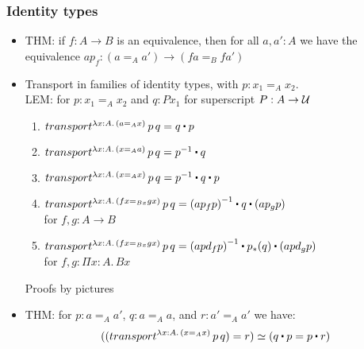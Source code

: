\documentclass[handout]{beamer}
\newcommand{\depi}[3]{\Pi{#1{:}#2.\,#3}}
\newcommand{\lamt}[3]{\lambda{#1{:}#2.\,#3}}
\newcommand{\UU}{{\cal U}}
\newcommand{\ct}{%
  \mathchoice{\mathbin{\raisebox{0.5ex}{$\displaystyle\centerdot$}}}%
             {\mathbin{\raisebox{0.5ex}{$\centerdot$}}}%
             {\mathbin{\raisebox{0.25ex}{$\scriptstyle\,\centerdot\,$}}}%
             {\mathbin{\raisebox{0.1ex}{$\scriptscriptstyle\,\centerdot\,$}}}
}
\newcommand{\opp}[1]{\mathord{{#1}^{-1}}}
\begin{document}
 \frame
  {

    \frametitle{Identity types}

    \begin{itemize}[<+->]
    \item THM: if $f:A\to B$ is an equivalence, then for all $a,a':A$ we have the equivalence
          $ap_f : (a =_A a') \to (fa =_B fa')$
    \item Transport in families of identity types, with $p: x_1 =_A x_2$.\\
      LEM:  for $p: x_1 =_A x_2$ and $q: Px_1$ for superscript $P:A\to\UU$
      \begin{enumerate}[<+->]
      \item $transport^{\lamt{x}{A}{(a=_A x)}}\,p\,q = q\ct p$
      \item $transport^{\lamt{x}{A}{(x=_A a)}}\,p\,q = \opp p \ct q$
      \item $transport^{\lamt{x}{A}{(x=_A x)}}\,p\,q = \opp p \ct q \ct p$
      \item $transport^{\lamt{x}{A}{(fx=_{Bx} gx)}}\,p\,q = \opp{(ap_f p)} \ct q \ct (ap_g p)$\\
for $f,g: A\to B$
      \item $transport^{\lamt{x}{A}{(fx=_{Bx} gx)}}\,p\,q = \opp{(apd_f p)} \ct p_*(q) \ct (apd_g p)$\\
for $f,g: \depi{x}{A}{Bx}$
      \end{enumerate}
       Proofs by pictures
    \item THM: for $p:a=_A a'$, $q:a=_A a$, and $r:a'=_A a'$ we have:
    $$((transport^{\lamt{x}{A}{(x=_A x)}}\,p\,q) = r)\simeq(q\ct p = p\ct r)$$
    \end{itemize}
  }
\end{document}
